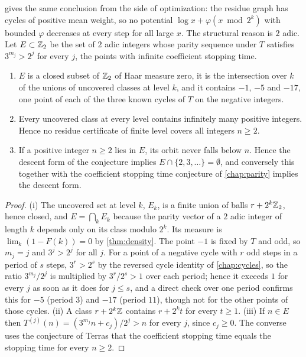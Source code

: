  gives the same conclusion from the side of
optimization: the residue graph has cycles of positive mean weight, so no potential $\log x+\varphi(x\bmod2^k)$ with bounded $\varphi$ decreases at every step for all large $x$.
The structural reason is $2$ adic. Let $E\subset\mathbb{Z}_2$ be the set of $2$ adic
integers whose parity sequence under $T$ satisfies $3^{m_j}>2^j$ for every $j$,
the points with infinite coefficient stopping time.

\begin{proposition}
\label{prop:ch10b:residue}
\leavevmode
\begin{enumerate}[label=(\roman*),leftmargin=2em]
\item $E$ is a closed subset of $\mathbb{Z}_2$ of Haar measure zero, it is the
  intersection over $k$ of the unions of uncovered classes at level $k$, and it
  contains $-1$, $-5$ and $-17$, one point of each of the three known cycles of $T$ on the negative
  integers.
\item Every uncovered class at every level contains infinitely many positive
  integers. Hence no residue certificate of finite level covers all integers
  $n\ge2$.
\item If a positive integer $n\ge2$ lies in $E$, its orbit never falls below
  $n$. Hence the descent form of the conjecture implies $E\cap\{2,3,\ldots\}=
  \emptyset$, and conversely this together with the coefficient stopping time
  conjecture of \cref{chap:parity} implies the descent form.
\end{enumerate}
\end{proposition}

\begin{proof}
(i) The uncovered set at level $k$, $E_k$, is a finite union of balls
$r+2^k\mathbb{Z}_2$, hence closed, and $E=\bigcap_kE_k$ because the parity vector of a
$2$ adic integer of length $k$ depends only on its class modulo $2^k$. Its
measure is $\lim_k(1-F(k))=0$ by \cref{thm:density}. The point $-1$ is fixed by
$T$ and odd, so $m_j=j$ and $3^j>2^j$ for all $j$. For a point of a negative cycle with $r$ odd steps in a period of $s$ steps,
$3^r>2^s$ by the reversed cycle identity of \cref{chap:cycles}, so the ratio
$3^{m_j}/2^j$ is multiplied by $3^r/2^s>1$ over each period; hence it exceeds $1$
for every $j$ as soon as it does for $j\le s$, and a direct check over one period
confirms this for $-5$ (period $3$) and $-17$ (period $11$), though not for the
other points of those cycles. (ii) A class $r+2^k\mathbb{Z}$ contains
$r+2^kt$ for every $t\ge1$. (iii) If $n\in E$ then
$T^{(j)}(n)=(3^{m_j}n+c_j)/2^j>n$ for every $j$, since $c_j\ge0$. The converse uses
the conjecture of Terras that the coefficient stopping time equals the stopping
time for every $n\ge2$.
\end{proof}


